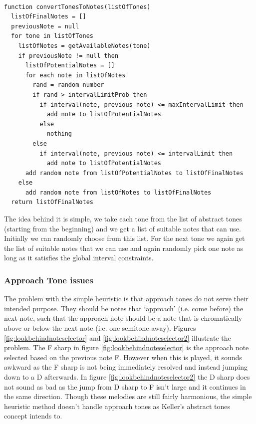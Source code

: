 \documentclass[pdftex,12pt,a4paper]{report}
\begin{document}
\begin{verbatim}

function convertTonesToNotes(listOfTones)
  listOfFinalNotes = []
  previousNote = null
  for tone in listOfTones
    listOfNotes = getAvailableNotes(tone)
    if previousNote != null then
      listOfPotentialNotes = []
      for each note in listOfNotes
        rand = random number
        if rand > intervalLimitProb then
          if interval(note, previous note) <= maxIntervalLimit then
            add note to listOfPotentialNotes
          else
            nothing
        else
          if interval(note, previous note) <= intervalLimit then
            add note to listOfPotentialNotes
      add random note from listOfPotentialNotes to listOfFinalNotes
    else
      add random note from listOfNotes to listOfFinalNotes
  return listOfFinalNotes

\end{verbatim}

The idea behind it is simple, we take each tone from the list of abstract tones (starting from the beginning) and we get a list of suitable notes that can use. Initially we can randomly choose from this list. For the next tone we again get the list of suitable notes that we can use and again randomly pick one note as long as it satisfies the global interval constraints.

\subsubsection{Approach Tone issues}
The problem with the simple heuristic is that approach tones do not serve their intended purpose. They should be notes that `approach' (i.e. come before) the next note, such that the approach note should be a note that is chromatically above or below the next note (i.e. one semitone away). Figures \ref{fig:lookbehindnoteselector} and \ref{fig:lookbehindnoteselector2} illustrate the problem. The F sharp in figure \ref{fig:lookbehindnoteselector} is the approach note selected based on the previous note F. However when this is played, it sounds awkward as the F sharp is not being immediately resolved and instead jumping down to a D afterwards. In figure \ref{fig:lookbehindnoteselector2} the D sharp does not sound as bad as the jump from D sharp to F isn't large and it continues in the same direction. Though these melodies are still fairly harmonious, the simple heuristic method doesn't handle approach tones as Keller's abstract tones concept intends to.
\end{document}
